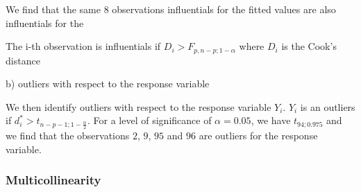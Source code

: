 We find that the same $8$ observations influentials for the fitted values are also influentials for the 




The i-th observation is influentials if $D_i > F_{p,n-p;1-\alpha}$ where $D_i$ is the Cook's distance


b) outliers with respect to the response variable

We then identify outliers with respect to the response variable $Y_i$. $Y_i$ is an outliers if $d_i^{\ast} > t_{n-p-1;1 - \frac{\alpha}{2}}$. For a level of significance of $\alpha = 0.05$, we have $t_{94 ; 0.975}$ and we find that the observations $2$, $9$, $95$ and $96$ are outliers for the response variable.

\subsubsection{Multicollinearity}


